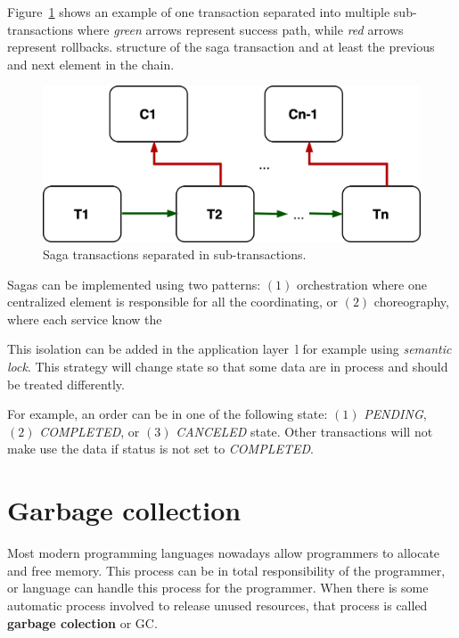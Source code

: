 Figure~\ref{fig:fig20} shows an example of one transaction separated into multiple sub-transactions where \emph{green} arrows represent success path, while \emph{red} arrows represent rollbacks. structure of the saga transaction and at least the previous and next element in the chain.

\begin{figure}[H]
	\begin{center}
		\includegraphics[scale=0.9]{images/Figure20.png}
	\end{center}
	\vspace{-0.6cm}
	\caption{Saga transactions separated in sub-transactions.}
	\label{fig:fig20}
\end{figure}

\noindent
Sagas can be implemented using two patterns: $(1)$ orchestration where one centralized element is responsible for all the coordinating, or $(2)$ choreography, where each service know the 

This isolation can be added in the application layer~\cite{Frank}l for example using \emph{semantic lock}. This strategy will change state so that some data are in process and should be treated differently. 

For example, an order can be in one of the following state: $(1)$ \emph{PENDING}, $(2)$ \emph{COMPLETED}, or $(3)$ \emph{CANCELED} state. Other transactions will not make use the data if status is not set to \emph{COMPLETED}.
%
%
\section{Garbage collection}\label{sec:garbage_collection}
%
Most modern programming languages nowadays allow programmers to allocate and free memory. This process can be in total responsibility of the programmer, or language can handle this process for the programmer. When there is some automatic process involved to release unused resources, that process is called \textbf{garbage colection} or GC. 


